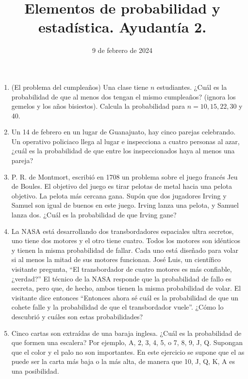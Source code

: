 \documentclass{article}
\title{Elementos de probabilidad y estadística. Ayudantía 2.}
\date{9 de febrero de 2024}
\begin{document}
\maketitle


\begin{enumerate}
    \item (El problema del cumpleaños) Una clase tiene $n$ estudiantes. ¿Cuál es la
    probabilidad de que al menos dos tengan el mismo cumpleaños? (ignora los gemelos
    y los años bisiestos). Calcula la probabilidad para $n=10,15,22,30$ y 40.

    \item Un 14 de febrero en un lugar de Guanajuato, hay cinco parejas celebrando.
    Un operativo policiaco llega al lugar e inspecciona a cuatro personas al azar,
    ¿cuál es la probabilidad de que entre los inspeccionados haya al menos una pareja?

    \item P. R. de Montmort, escribió en 1708 un problema sobre el juego francés
    Jeu de Boules.  El objetivo del juego es  tirar pelotas de metal hacia una pelota 
    objetivo.  La pelota más cercana gana.  Supón que dos jugadores Irving y Samuel son igual
    de buenos en este juego. Irving lanza una pelota, y Samuel lanza dos. ¿Cuál es la
    probabilidad de que Irving gane?

    \item La NASA está desarrollando dos transbordadores espaciales ultra secretos,
    uno tiene dos motores y el otro tiene cuatro.  Todos los motores son idénticos 
    y tienen la misma probabilidad de fallar.  Cada uno está diseñado para volar si 
    al menos la mitad de sus motores funcionan.  José Luis, un científico visitante pregunta,
    ``El transbordador de cuatro motores es más confiable, ¿verdad?'' El técnico de
    la NASA responde que la probabilidad de fallo es secreta, pero que, de hecho, 
    ambos tienen la misma probabilidad de volar. El visitante dice entonces ``Entonces
    ahora sé cuál es la probabilidad de que un cohete falle y la probabilidad de que
    el transbordador vuele''. ¿Cómo lo descubrió y cuáles son estas probabilidades?
    
    \item Cinco cartas son extraídas de una baraja inglesa. ¿Cuál es la probabilidad de que 
    formen una escalera? Por ejemplo, A, 2, 3, 4, 5, o 7, 8, 9, J, Q. Supongan que el color y el palo no son importantes. 
    En este ejercicio se supone que el as puede ser la carta más baja o la más alta, de manera que 10, J, Q, K, A 
    es una posibilidad.
    

\end{enumerate}
\end{document}
